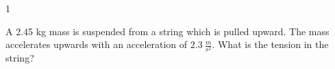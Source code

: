 
\AddToShipoutPicture*{\BackgroundPic}

\addtocounter {ProbNum} {1}

 
{\bf \Large{}} A 2.45 kg mass is suspended from a string which is pulled upward. The mass accelerates upwards with an acceleration of ${2.3~\tfrac{m}{s^2}}$. 
\bigskip
What is the tension in the string?



\vfill
\newpage